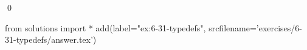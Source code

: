 
\begin{ex}
  \label{ex:6-31-typedefs}
  
  \qed
\end{ex}
\begin{python0}
from solutions import *
add(label="ex:6-31-typedefs",
    srcfilename='exercises/6-31-typedefs/answer.tex')
\end{python0}
